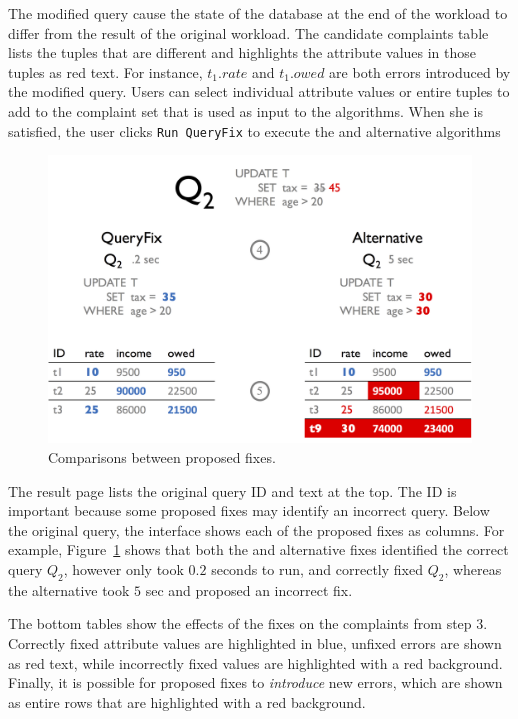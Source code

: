  The modified query cause the state of the database at the end of the workload
to differ from the result of the original workload.  The candidate complaints table lists the tuples
that are different and highlights the attribute values in those tuples as red text.  For instance,
$t_1.rate$ and $t_1.owed$ are both errors introduced by the modified query.  Users can select individual
attribute values or entire tuples to add to the complaint set that is used as input to the \sys algorithms.  
When she is satisfied, the user clicks \texttt{Run QueryFix} to execute the \sys and alternative algorithms


\begin{figure}[h]
\centering
  \includegraphics[width = .85\columnwidth]{figures/demo2}
  \caption{Comparisons between proposed fixes.}
  \label{f:demo2} 
\end{figure}

  The result page lists the original query ID and text at the top.  The ID 
is important because some proposed fixes may identify an incorrect query.  Below the original query,
the interface shows each of the proposed fixes as columns.  For example, Figure~\ref{f:demo2} shows 
that both the \sys and alternative fixes identified the correct query $Q_2$, however \sys only took $0.2$ seconds
to run, and correctly fixed $Q_2$, whereas the alternative took $5$ sec and proposed an incorrect fix.

 The bottom tables show the effects of the fixes on the complaints from
step 3.  Correctly fixed attribute values are highlighted in blue, unfixed errors are shown as red text, while incorrectly
fixed values are highlighted with a red background.  Finally, it is possible for proposed fixes to 
{\it introduce} new errors, which are shown as entire rows that are highlighted with a red background.







